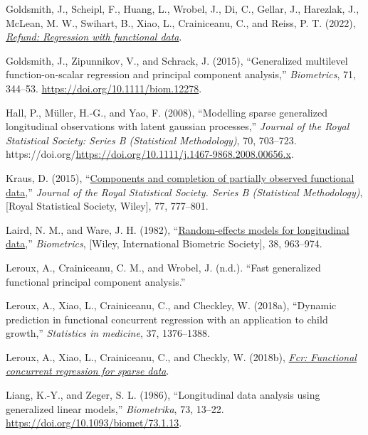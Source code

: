 \documentclass[
  11pt,
]{article}
\newlength{\cslhangindent}
\newlength{\cslentryspacingunit} %
\newenvironment{CSLReferences}[2] %
 {%
  \setlength{\parindent}{0pt}
  \ifodd #1
  \let\oldpar\par
  \def\par{\hangindent=\cslhangindent\oldpar}
  \fi
  \setlength{\parskip}{#2\cslentryspacingunit}
 }%
 {}
\begin{document}
\begin{CSLReferences}{1}{0}
\leavevmode{}%
Goldsmith, J., Scheipl, F., Huang, L., Wrobel, J., Di, C., Gellar, J.,
Harezlak, J., McLean, M. W., Swihart, B., Xiao, L., Crainiceanu, C., and
Reiss, P. T. (2022),
\emph{\href{https://CRAN.R-project.org/package=refund}{Refund:
Regression with functional data}}.

\leavevmode{}%
Goldsmith, J., Zipunnikov, V., and Schrack, J. (2015), {``Generalized
multilevel function-on-scalar regression and principal component
analysis,''} \emph{Biometrics}, 71, 344--53.
\url{https://doi.org/10.1111/biom.12278}.

\leavevmode{}%
Hall, P., Müller, H.-G., and Yao, F. (2008), {``Modelling sparse
generalized longitudinal observations with latent gaussian processes,''}
\emph{Journal of the Royal Statistical Society: Series B (Statistical
Methodology)}, 70, 703--723.
https://doi.org/\url{https://doi.org/10.1111/j.1467-9868.2008.00656.x}.

\leavevmode{}%
Kraus, D. (2015),
{``\href{http://www.jstor.org/stable/24775309}{Components and completion
of partially observed functional data},''} \emph{Journal of the Royal
Statistical Society. Series B (Statistical Methodology)}, {[}Royal
Statistical Society, Wiley{]}, 77, 777--801.

\leavevmode{}%
Laird, N. M., and Ware, J. H. (1982),
{``\href{http://www.jstor.org/stable/2529876}{Random-effects models for
longitudinal data},''} \emph{Biometrics}, {[}Wiley, International
Biometric Society{]}, 38, 963--974.

\leavevmode{}%
Leroux, A., Crainiceanu, C. M., and Wrobel, J. (n.d.). {``Fast
generalized functional principal component analysis.''}

\leavevmode{}%
Leroux, A., Xiao, L., Crainiceanu, C., and Checkley, W. (2018a),
{``Dynamic prediction in functional concurrent regression with an
application to child growth,''} \emph{Statistics in medicine}, 37,
1376--1388.

\leavevmode{}%
Leroux, A., Xiao, L., Crainiceanu, C., and Checkly, W. (2018b),
\emph{\href{https://CRAN.R-project.org/package=fcr}{Fcr: Functional
concurrent regression for sparse data}}.

\leavevmode{}%
Liang, K.-Y., and Zeger, S. L. (1986), {``Longitudinal data analysis
using generalized linear models,''} \emph{Biometrika}, 73, 13--22.
\url{https://doi.org/10.1093/biomet/73.1.13}.


\end{CSLReferences}
\end{document}

